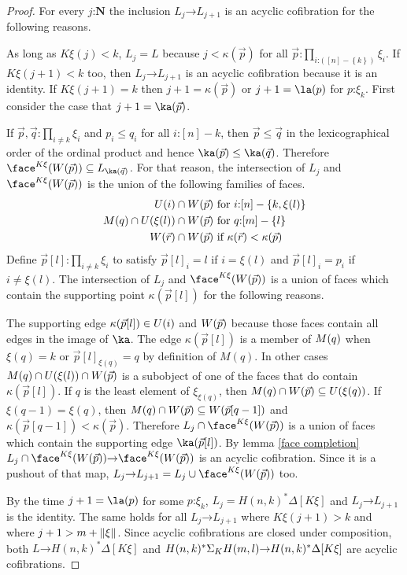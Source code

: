 \documentclass{amsart}
\theoremstyle{plain}
\theoremstyle{definition}
\newcommand\set[1]{\left\{#1\right\}}
\newcommand\ri{^*}
\newcommand\nno{\mathbf N}
\newcommand\of{\mathord:}
\renewcommand\to{\mathord\rightarrow}
\newcommand\simplex\Delta
\begin{document}
\begin{proof}
For every $j\of\nno$ the inclusion $L_j\to L_{j+1}$ is an acyclic cofibration for the following reasons.

As long as $K\xi(j)<k$, $L_j = L$ because $j<\kappa(\vec p)$ for all $\vec p \of\prod_{i\of([n]-\set k)}\xi_i$. If $K\xi(j+1)<k$ too, then $L_j\to L_{j+1}$ is an acyclic cofibration because it is an identity. If $K\xi(j+1) = k$ then $j+1=\kappa(\vec p)$ or $j+1 = \la(p)$ for $p\of\xi_k$. First consider the case that $j+1=\ka(\vec p)$. 

If $\vec p,\vec q\of\prod_{i\neq k} \xi_i$ and $p_i\leq q_i$ for all $i\of[n]-k$, then $\vec p \leq \vec q$ in the lexicographical order of the ordinal product and hence $\ka(\vec p)\leq \ka(\vec q)$. Therefore $\face^{K\xi}(\W(\vec p))\subseteq L_{\ka(\vec q)}$. For that reason, the intersection of $L_j$ and $\face^{K\xi}(\W(\vec p))$ is the union of the following families of faces.
\begin{align*}
\U(i)\cap \W(\vec p) &\textrm{ for $i\of[n]-\set{k,\xi(l)}$}\\
\A(q)\cap\U(\xi(l))\cap \W(\vec p) &\textrm{ for $q\of[m]-\set l$}\\
\W(\vec r)\cap \W(\vec p) &\textrm{ if $\kappa(\vec r)<\kappa(\vec p)$ }
\end{align*}
Define $\vec p[l]\of\prod_{i\neq k} \xi_i$ to satisfy $\vec p[l]_i = l$ if $i=\xi(l)$ and $\vec p[l]_i = p_i$ if $i\neq \xi(l)$. The intersection of $L_j$ and $\face^{K\xi}(\W(\vec p))$ is a union of faces which contain the supporting point $\kappa(\vec p[l])$ for the following reasons. 

The supporting edge $\kappa(\vec p[l])\in U(i)$ and $W(\vec p)$ because those faces contain all edges in the image of $\ka$. The edge $\kappa(\vec p[l])$ is a member of $M(q)$ when $\xi(q)=k$ or $\vec p[l]_{\xi(q)}=q$ by definition of $M(q)$. In other cases $M(q)\cap U(\xi(l))\cap W(\vec p)$ is a subobject of one of the faces that do contain $\kappa(\vec p[l])$. If $q$ is the least element of $\xi_{\xi(q)}$, then $M(q)\cap W(\vec p)\subseteq U(\xi(q))$. If $\xi(q-1)=\xi(q)$, then $M(q)\cap W(\vec p) \subseteq W(\vec p[q-1])$ and $\kappa(\vec p[q-1])<\kappa(\vec p)$. Therefore $L_j\cap \face^{K\xi}(\W(\vec p))$ is a union of faces which contain the supporting edge $\ka(\vec p[l])$. By lemma \ref{face completion} $L_j\cap \face^{K\xi}(\W(\vec p))\to \face^{K\xi}(\W(\vec p))$ is an acyclic cofibration. Since it is a pushout of that map, $L_j\to L_{j+1} = L_j\cup \face^{K\xi}(\W(\vec p))$ too.

By the time $j+1 = \la(p)$ for some $p\of \xi_k$, $L_j = H(n,k)\ri \simplex[K\xi]$ and $L_j\to L_{j+1}$ is the identity. The same holds for all $L_j\to L_{j+1}$ where $K\xi(j+1)>k$ and where $j+1>m+\Vert \xi \Vert$. Since acyclic cofibrations are closed under composition, both $L\to H(n,k)\ri \simplex[K\xi]$ and $H(n,k)\ri \depsum K H(m,l) \to H(n,k)\ri \simplex[K\xi]$ are acyclic cofibrations.
\end{proof}
\end{document}

